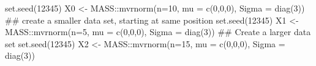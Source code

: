 \begin{Schunk}
\begin{Sinput}
    set.seed(12345)
    X0 <- MASS::mvrnorm(n=10, mu = c(0,0,0), Sigma = diag(3))
    ## create a smaller data set, starting at same position
    set.seed(12345)
    X1 <- MASS::mvrnorm(n=5, mu = c(0,0,0), Sigma = diag(3))
    ## Create a larger data set
    set.seed(12345)
    X2 <- MASS::mvrnorm(n=15, mu = c(0,0,0), Sigma = diag(3))
\end{Sinput}
\end{Schunk}
